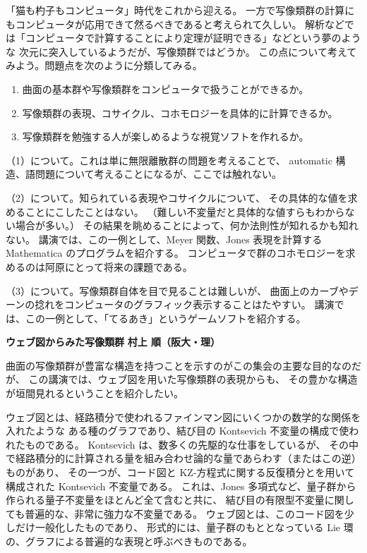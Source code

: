 \documentclass[uplatex,dvipdfmx]{jlreq}
\begin{document}
\medskip

「猫も杓子もコンピュータ」時代をこれから迎える。
一方で写像類群の計算にもコンピュータが応用できて然るべきであると考えられて久しい。
解析などでは「コンピュータで計算することにより定理が証明できる」などという夢のような
次元に突入しているようだが、写像類群ではどうか。
この点について考えてみよう。問題点を次のように分類してみる。
\begin{enumerate}
  \setlength{\itemsep}{2pt}
  \item[(1)] 曲面の基本群や写像類群をコンピュータで扱うことができるか。
  \item[(2)] 写像類群の表現、コサイクル、コホモロジーを具体的に計算できるか。
  \item[(3)] 写像類群を勉強する人が楽しめるような視覚ソフトを作れるか。
\end{enumerate}

（1）について。これは単に無限離散群の問題を考えることで、
automatic 構造、語問題について考えることになるが、ここでは触れない。

（2）について。知られている表現やコサイクルについて、
その具体的な値を求めることにこしたことはない。
（難しい不変量だと具体的な値すらもわからない場合が多い。）
その結果を眺めることによって、何か法則性が知れるかも知れない。
講演では、この一例として、Meyer 関数、Jones 表現を計算する
Mathematica のプログラムを紹介する。
コンピュータで群のコホモロジーを求めるのは阿原にとって将来の課題である。

（3）について。写像類群自体を目で見ることは難しいが、
曲面上のカーブやデーンの捻れをコンピュータのグラフィック表示することはたやすい。
講演では、この一例として、「てるあき」というゲームソフトを紹介する。

\newpage

\noindent
{\large\bfseries ウェブ図からみた写像類群}
\hfill
{\large\bfseries 村上 順（阪大・理）}

\medskip

曲面の写像類群が豊富な構造を持つことを示すのがこの集会の主要な目的なのだが、
この講演では、ウェブ図を用いた写像類群の表現からも、
その豊かな構造が垣間見れるということを紹介したい。

ウェブ図とは、経路積分で使われるファインマン図にいくつかの数学的な関係を入れたような
ある種のグラフであり、結び目の Kontsevich 不変量の構成で使われたものである。
Kontsevich は、数多くの先駆的な仕事をしているが、
その中で経路積分的に計算される量を組み合わせ論的な量であらわす（またはこの逆）ものがあり、
その一つが、コード図と KZ-方程式に関する反復積分とを用いて構成された Kontsevich 不変量である。
これは、Jones 多項式など、量子群から作られる量子不変量をほとんど全て含むと共に、
結び目の有限型不変量に関しても普遍的な、非常に強力な不変量である。
ウェブ図とは、このコード図を少しだけ一般化したものであり、
形式的には、量子群のもととなっている Lie 環の、グラフによる普遍的な表現と呼ぶべきものである。
\end{document}

